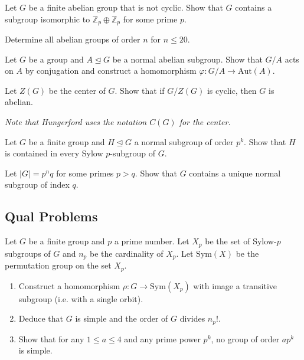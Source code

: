 \begin{problem}[Hungerford 2.2.1]
\label{prob:1.3}
Let $G$ be a finite abelian group that is not cyclic. Show that $G$ contains a subgroup isomorphic to $\mathbb{Z}_p \oplus \mathbb{Z}_p$ for some prime $p$.
\end{problem}

\begin{problem}[Hungerford 2.2.12.b]
\label{prob:1.4}
Determine all abelian groups of order $n$ for $n\leq 20$.
\end{problem}

\begin{problem}[Hungerford 2.4.1]
\label{prob:1.5}
Let $G$ be a group and $A \trianglelefteq G$ be a normal abelian subgroup. Show that $G/A$ acts on $A$ by conjugation and construct a homomorphism $\varphi: G/A \to \mathrm{Aut}(A)$.
\end{problem}

\begin{problem}[Hungerford 2.4.9]
\label{prob:1.6}
Let $Z(G)$ be the center of $G$. Show that if $G/Z(G)$ is cyclic, then $G$ is abelian.

\textit{Note that Hungerford uses the notation $C(G)$ for the center.}
\end{problem}

\begin{problem}[Hungerford 2.5.6]
\label{prob:1.7}
Let $G$ be a finite group and $H \trianglelefteq G$ a normal subgroup of order $p^k$. Show that $H$ is contained in every Sylow $p$-subgroup of $G$.
\end{problem}

\begin{problem}[Hungerford 2.5.9]
\label{prob:1.8}
Let $\left| G \right| = p^n q$ for some primes $p > q$. Show that $G$ contains a unique normal subgroup of index $q$.
\end{problem}

\subsection{Qual Problems}

\begin{problem}
\label{prob:1.9}
Let $G$ be a finite group and $p$ a prime number. Let $X_p$ be the set of Sylow-$p$ subgroups of $G$ and $n_p$ be the cardinality of $X_p$. Let $\mathrm{Sym}(X)$ be the permutation group on the set $X_p$.
    \begin{enumerate}
        \item Construct a homomorphism $\rho: G \to \mathrm{Sym}(X_p)$ with image a transitive subgroup (i.e. with a single orbit).
        \item Deduce that $G$ is simple and the order of $G$ divides $n_p!$.
        \item Show that for any $1\leq a \leq 4$ and any prime power $p^k$, no group of order $ap^k$ is simple.
    \end{enumerate}
\end{problem}

